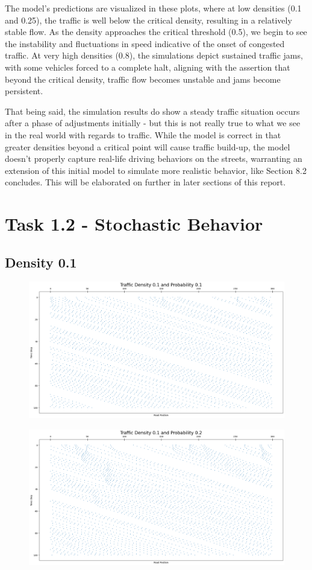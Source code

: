 \documentclass{article}
\begin{document}
\begin{enumerate}
    The model's predictions are visualized in these plots, where at low densities (0.1 and 0.25), the traffic is well below the critical density, resulting in a relatively stable flow. As the density approaches the critical threshold (0.5), we begin to see the instability and fluctuations in speed indicative of the onset of congested traffic. At very high densities (0.8), the simulations depict sustained traffic jams, with some vehicles forced to a complete halt, aligning with the assertion that beyond the critical density, traffic flow becomes unstable and jams become persistent.

    That being said, the simulation results do show a steady traffic situation occurs after a phase of adjustments initially - but this is not really true to what we see in the real world with regards to traffic. While the model is correct in that greater densities beyond a critical point will cause traffic build-up, the model doesn't properly capture real-life driving behaviors on the streets, warranting an extension of this initial model to simulate more realistic behavior, like Section 8.2 concludes. This will be elaborated on further in later sections of this report. 
\end{enumerate}

\newpage
\section{Task 1.2 - Stochastic Behavior}
\subsection{Density 0.1}
\begin{figure}[!h]
    \centering
    \includegraphics[width=0.70\linewidth]{assets/d0.1p0.1.png}
\end{figure}

\begin{figure}[!h]
    \centering
    \includegraphics[width=0.70\linewidth]{assets/d0.1p0.2.png}
\end{figure}
\end{document}
